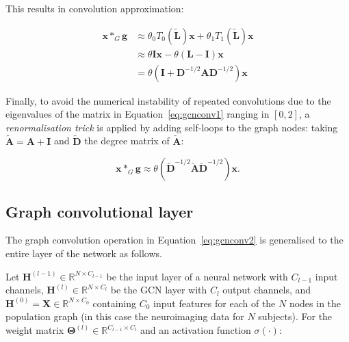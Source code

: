 This results in convolution approximation:

\begin{align}
    \mathbf{x} *_G \mathbf{g} &\approx \theta_0 T_0(\mathbf{\tilde{L}}) \mathbf{x} + \theta_1 T_1(\mathbf{\tilde{L}}) \mathbf{x} \\
    &\approx \theta \mathbf{I} \mathbf{x} - \theta (\mathbf{L} - \mathbf{I}) \mathbf{x} \\
    \label{eq:gcnconv1}
    &= \theta(\mathbf{I} + \mathbf{D}^{-1/2}\mathbf{A}\mathbf{D}^{-1/2})\mathbf{x}
\end{align}

Finally, to avoid the numerical instability of repeated convolutions due to the eigenvalues of the matrix in Equation~\eqref{eq:gcnconv1} ranging in $[0, 2]$, a \textit{renormalisation trick} is applied by adding self-loops to the graph nodes: taking $\mathbf{\tilde{A}} = \mathbf{A} + \mathbf{I}$ and $\mathbf{\tilde{D}}$ the degree matrix of $\mathbf{\tilde{A}}$: 

\begin{equation}
    \label{eq:gcnconv2}
    \mathbf{x} *_G \mathbf{g} \approx \theta(\mathbf{\tilde{D}}^{-1/2}\mathbf{\tilde{A}}\mathbf{\tilde{D}}^{-1/2})\mathbf{x}.
\end{equation}
 


\subsection{Graph convolutional layer}
The graph convolution operation in Equation~\ref{eq:gcnconv2} is generalised to the entire layer of the network as follows. 

Let $\mathbf{H}^{(l-1)} \in \mathbb{R}^{N\times C_{l-1}}$ be the input layer of a neural network with $C_{l-1}$ input channels, $\mathbf{H}^{(l)} \in \mathbb{R}^{N\times C_{l}}$ be the GCN layer with $C_{l}$ output channels, and $\mathbf{H}^{(0)} = \mathbf{X} \in \mathbb{R}^{N \times C_0}$ containing $C_0$ input features for each of the $N$ nodes in the population graph (in this case the neuroimaging data for $N$ subjects). For the weight matrix $\mathbf{\Theta}^{(l)} \in \mathbb{R}^{C_{l-1}\times C_{l}}$ and an activation function $\sigma(\cdot)$:

